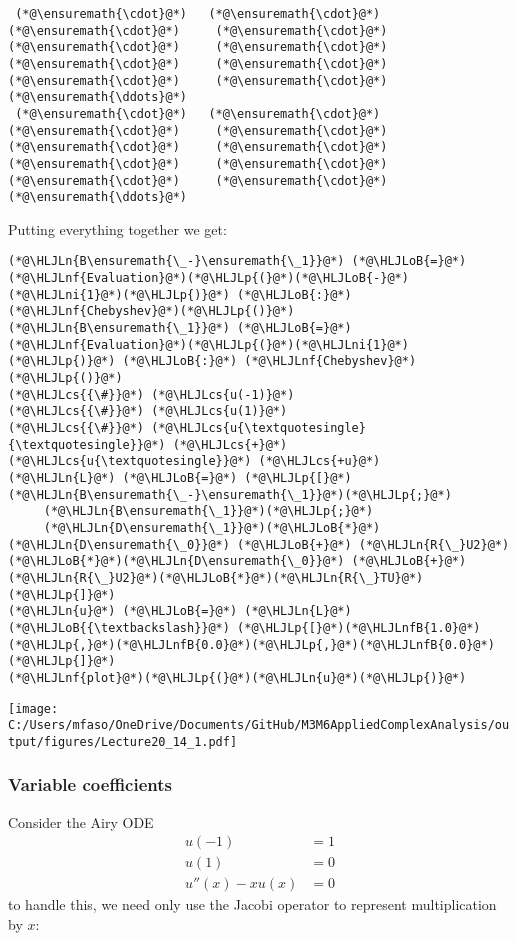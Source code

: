 \documentclass[12pt,landscape]{article}
\newcommand{\HLJLn}[1]{#1}
\newcommand{\HLJLnf}[1]{\textcolor[RGB]{66,102,213}{#1}}
\newcommand{\HLJLnfB}[1]{\textcolor[RGB]{59,151,46}{#1}}
\newcommand{\HLJLni}[1]{\textcolor[RGB]{59,151,46}{#1}}
\newcommand{\HLJLoB}[1]{\textcolor[RGB]{102,102,102}{\textbf{#1}}}
\newcommand{\HLJLp}[1]{#1}
\newcommand{\HLJLcs}[1]{\textcolor[RGB]{153,153,119}{\textit{#1}}}
\def\cent#1{\begin{center}#1\end{center} }
\begin{document}
{\begin{lstlisting}
 (*@\ensuremath{\cdot}@*)   (*@\ensuremath{\cdot}@*)    (*@\ensuremath{\cdot}@*)     (*@\ensuremath{\cdot}@*)     (*@\ensuremath{\cdot}@*)     (*@\ensuremath{\cdot}@*)     (*@\ensuremath{\cdot}@*)     (*@\ensuremath{\cdot}@*)     (*@\ensuremath{\cdot}@*)     (*@\ensuremath{\cdot}@*)   (*@\ensuremath{\ddots}@*)
 (*@\ensuremath{\cdot}@*)   (*@\ensuremath{\cdot}@*)    (*@\ensuremath{\cdot}@*)     (*@\ensuremath{\cdot}@*)     (*@\ensuremath{\cdot}@*)     (*@\ensuremath{\cdot}@*)     (*@\ensuremath{\cdot}@*)     (*@\ensuremath{\cdot}@*)     (*@\ensuremath{\cdot}@*)     (*@\ensuremath{\cdot}@*)   (*@\ensuremath{\ddots}@*)
\end{lstlisting}


Putting everything together we get:


\begin{lstlisting}
(*@\HLJLn{B\ensuremath{\_-}\ensuremath{\_1}}@*) (*@\HLJLoB{=}@*) (*@\HLJLnf{Evaluation}@*)(*@\HLJLp{(}@*)(*@\HLJLoB{-}@*)(*@\HLJLni{1}@*)(*@\HLJLp{)}@*) (*@\HLJLoB{:}@*) (*@\HLJLnf{Chebyshev}@*)(*@\HLJLp{()}@*)
(*@\HLJLn{B\ensuremath{\_1}}@*) (*@\HLJLoB{=}@*) (*@\HLJLnf{Evaluation}@*)(*@\HLJLp{(}@*)(*@\HLJLni{1}@*)(*@\HLJLp{)}@*) (*@\HLJLoB{:}@*) (*@\HLJLnf{Chebyshev}@*)(*@\HLJLp{()}@*)
(*@\HLJLcs{{\#}}@*) (*@\HLJLcs{u(-1)}@*)
(*@\HLJLcs{{\#}}@*) (*@\HLJLcs{u(1)}@*)
(*@\HLJLcs{{\#}}@*) (*@\HLJLcs{u{\textquotesingle}{\textquotesingle}}@*) (*@\HLJLcs{+}@*) (*@\HLJLcs{u{\textquotesingle}}@*) (*@\HLJLcs{+u}@*)
(*@\HLJLn{L}@*) (*@\HLJLoB{=}@*) (*@\HLJLp{[}@*)(*@\HLJLn{B\ensuremath{\_-}\ensuremath{\_1}}@*)(*@\HLJLp{;}@*)
     (*@\HLJLn{B\ensuremath{\_1}}@*)(*@\HLJLp{;}@*)
     (*@\HLJLn{D\ensuremath{\_1}}@*)(*@\HLJLoB{*}@*)(*@\HLJLn{D\ensuremath{\_0}}@*) (*@\HLJLoB{+}@*) (*@\HLJLn{R{\_}U2}@*)(*@\HLJLoB{*}@*)(*@\HLJLn{D\ensuremath{\_0}}@*) (*@\HLJLoB{+}@*) (*@\HLJLn{R{\_}U2}@*)(*@\HLJLoB{*}@*)(*@\HLJLn{R{\_}TU}@*)(*@\HLJLp{]}@*)
(*@\HLJLn{u}@*) (*@\HLJLoB{=}@*) (*@\HLJLn{L}@*) (*@\HLJLoB{{\textbackslash}}@*) (*@\HLJLp{[}@*)(*@\HLJLnfB{1.0}@*)(*@\HLJLp{,}@*)(*@\HLJLnfB{0.0}@*)(*@\HLJLp{,}@*)(*@\HLJLnfB{0.0}@*)(*@\HLJLp{]}@*)
(*@\HLJLnf{plot}@*)(*@\HLJLp{(}@*)(*@\HLJLn{u}@*)(*@\HLJLp{)}@*)
\end{lstlisting}

\cent{\texttt{[image: C:/Users/mfaso/OneDrive/Documents/GitHub/M3M6AppliedComplexAnalysis/output/figures/Lecture20\_14\_1.pdf]}}

\subsubsection{Variable coefficients}
Consider the Airy ODE
\begin{align*}
u(-1) &= 1\\
u(1) &= 0\\
u''(x) - xu(x) &= 0
\end{align*}
to handle this, we need only use the Jacobi operator to represent multiplication by $x$:


}
\end{document}
